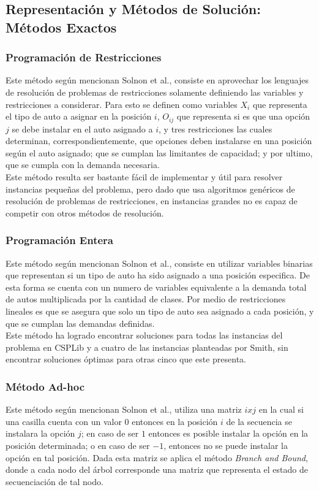 \documentclass[letter, 10pt]{article}
\begin{document}
\subsection{Representación y Métodos de Solución: Métodos Exactos}
\subsubsection{Programación de Restricciones}
Este método según mencionan Solnon et al.\cite{Solnon_Cung_Nguyen_Artigues_2008}, consiste en aprovechar los lenguajes de resolución de problemas de restricciones solamente definiendo las variables y restricciones a considerar. Para esto se definen como variables $X_i$ que representa el tipo de auto a asignar en la posición $i$, $O_{ij}$ que representa si es que una opción $j$ se debe instalar en el auto asignado a $i$, y tres restricciones las cuales determinan, correspondientemente, que opciones deben instalarse en una posición según el auto asignado; que se cumplan las limitantes de capacidad; y por ultimo, que se cumpla con la demanda necesaria.\\
Este método resulta ser bastante fácil de implementar y útil para resolver instancias pequeñas del problema, pero dado que usa algoritmos genéricos de resolución de problemas de restricciones, en instancias grandes no es capaz de competir con otros métodos de resolución.

\subsubsection{Programación Entera}
Este método según mencionan Solnon et al.\cite{Solnon_Cung_Nguyen_Artigues_2008}, consiste en utilizar variables binarias que representan si un tipo de auto ha sido asignado a una posición especifica. De esta forma se cuenta con un numero de variables equivalente a la demanda total de autos multiplicada por la cantidad de clases. Por medio de restricciones lineales es que se asegura que solo un tipo de auto sea asignado a cada posición, y que se cumplan las demandas definidas.\\
Este método ha logrado encontrar soluciones para todas las instancias del problema en CSPLib y a cuatro de las instancias planteadas por Smith, sin encontrar soluciones óptimas para otras cinco que este presenta.

\subsubsection{Método Ad-hoc}
Este método según mencionan Solnon et al.\cite{Solnon_Cung_Nguyen_Artigues_2008}, utiliza una matriz $i x j$ en la cual si una casilla cuenta con un valor $0$ entonces en la posición $i$ de la secuencia se instalara la opción $j$; en caso de ser $1$ entonces es posible instalar la opción en la posición determinada; o en caso de ser $-1$, entonces no se puede instalar la opción en tal posición. Dada esta matriz se aplica el método \textit{Branch and Bound}, donde a cada nodo del árbol corresponde una matriz que representa el estado de secuenciación de tal nodo.
\end{document}

